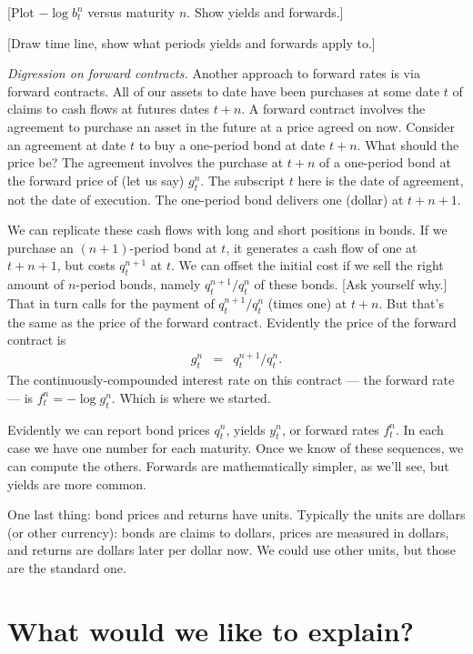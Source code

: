 \documentclass[11pt]{article}
\begin{document}
[Plot $-\log b^n_t$ versus maturity $n$.  Show yields and forwards.]

[Draw time line, show what periods yields and forwards apply to.]


{\it Digression on forward contracts.\/}
Another approach to forward rates is via forward contracts.
All of our assets to date have been purchases at some date $t$
of claims to cash flows at futures dates $t+n$.
A forward contract involves the agreement to purchase an asset in the future
at a price agreed on now.
Consider an agreement at date $t$  to buy a one-period bond at date $t+n$.
What should the price be?
The agreement involves the purchase at $t+n$ of a one-period bond at the forward price of (let us say) $g^n_t$.
The subscript $t$ here is the date of agreement, not the date of execution.
The one-period bond delivers one (dollar) at $t+n+1$.

We can replicate these cash flows with long and short positions in bonds.
If we purchase an $(n+1)$-period bond at $t$, it generates a cash flow of one at $t+n+1$,
but costs $q^{n+1}_t$ at $t$.
We can offset the initial cost if we sell the right amount of $n$-period bonds,
namely $ q^{n+1}_t/q^n_t$ of these bonds.  [Ask yourself why.]
That in turn calls for the payment of $ q^{n+1}_t/q^n_t$ (times one) at $t+n$.
But that's the same as the price of the forward contract.
Evidently the price of the forward contract is
\begin{eqnarray*}
    g^n_t &=&  q^{n+1}_t/q^n_t .
\end{eqnarray*}
The continuously-compounded interest rate on this contract --- the forward rate ---
is $ f^n_t = - \log g^n_t$.
Which is where we started.


Evidently we can report bond prices $q^n_t$,
yields $y^n_t$, or forward rates $f^n_t$.
In each case we have one number for each maturity.
Once we know of these sequences, we can compute the others.
Forwards are mathematically simpler, as we'll see, but yields are more common.

One last thing:  bond prices and returns have units.
Typically the units are dollars (or other currency):
bonds are claims to dollars, prices are measured in dollars,
and returns are dollars later per dollar now.
We could use other units, but those are the standard one.

\section{What would we like to explain?}
\end{document}
